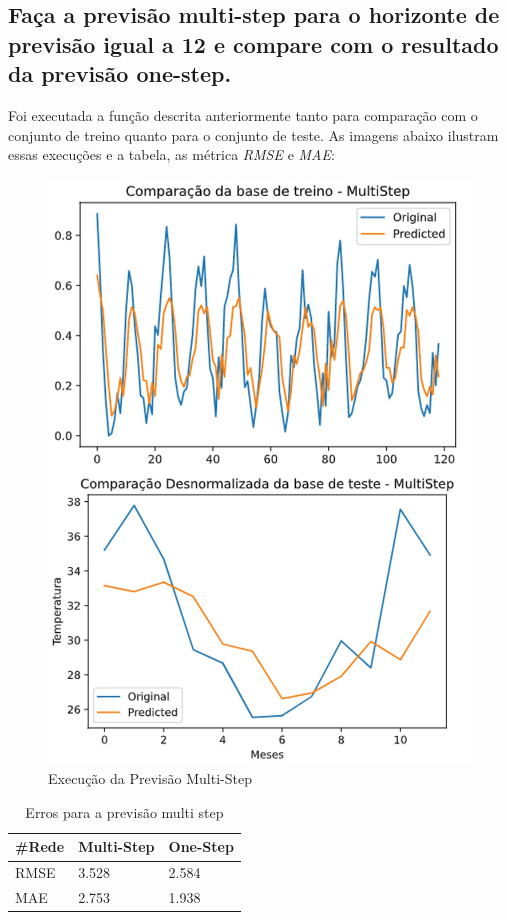 \documentclass[12pt]{article}
\begin{document}
	
	\subsection{Faça a previsão multi-step para o horizonte de previsão igual a 12 e compare com o resultado da previsão one-step.}
	
	Foi executada a função descrita anteriormente tanto para comparação com o conjunto de treino quanto para o conjunto de teste. As imagens abaixo ilustram essas execuções e a tabela, as métrica \textit{RMSE} e \textit{MAE}:
	\begin{figure}[H]
		\centering
		\includegraphics[width=0.7\linewidth]{Imagens/multistep/compMulti.jpg}
		\caption{Execução da Previsão Multi-Step}
		\label{fig:compmulti}
	\end{figure}
	\begin{table}[H]\label{tab:multiErros}
		\begin{tabular}{|l|l|l|}
			\hline
			\#Rede & Multi-Step & One-Step \\ \hline
			RMSE   & 3.528    & 2.584 \\ \hline
			MAE    &  2.753   & 1.938  \\ \hline
		\end{tabular}
		\centering
		\caption{Erros para a previsão multi step}
	\end{table}
\end{document}
